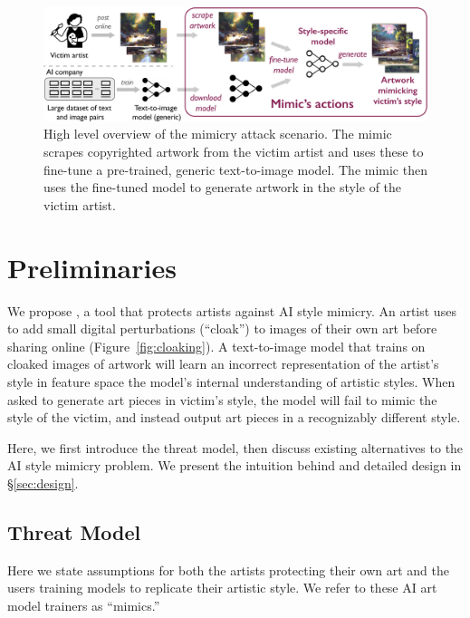 \begin{figure}[t]
  \centering
  \includegraphics[width=0.85\linewidth]{plots/overview/attack-scenario-emily.pdf}
  \caption{High level overview of the mimicry attack scenario. The mimic scrapes copyrighted artwork from the victim artist and uses these to fine-tune a pre-trained, generic text-to-image model. The mimic then uses the fine-tuned model to generate artwork in the style of the victim artist. }
  \label{fig:scenario}
\end{figure}

\secspace
\section{Preliminaries}
\label{sec:cloak}

We propose \system{}, a tool that protects artists against AI
style mimicry. An artist uses \system{} to add small digital perturbations
(``cloak'') to images of their own art before sharing online
(Figure~\ref{fig:cloaking}). A text-to-image model that trains on cloaked
images of artwork will learn an incorrect representation of the artist's style in
feature space \ie the model's internal understanding of artistic styles. When
asked to generate art pieces in victim's style, the model will fail to mimic
the style of the victim, and instead output art pieces in a recognizably 
different style. 

Here, we first introduce the threat model, then discuss existing alternatives
to the AI style mimicry problem. We present the intuition behind \system{} and detailed
design in \S\ref{sec:design}.

\secspace
\subsection{Threat Model}

Here we state assumptions for both the artists protecting their own art
and the users training models to replicate their artistic style. We
refer to these AI art model trainers as ``mimics.''


